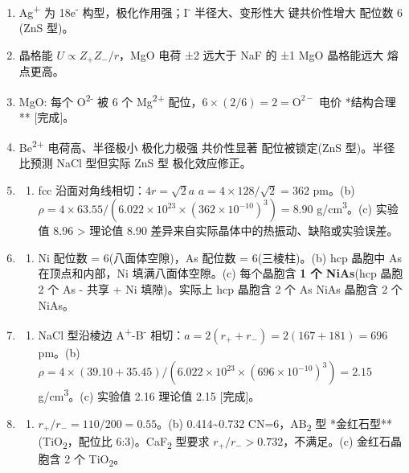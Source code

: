 \begin{enumerate}
\item
  Ag\textsuperscript{+} 为 18e\textsuperscript{-} 构型，极化作用强；I\textsuperscript{-} 半径大、变形性大 \箭 键共价性增大 \箭 配位数 6 (ZnS 型)。
\item
  晶格能 \(U \propto Z_+Z_-/r\)，MgO 电荷 ±2 远大于 NaF 的 ±1 \箭 MgO 晶格能远大 \箭 熔点更高。
\item
  MgO: 每个 O\textsuperscript{2-} 被 6 个 Mg\textsuperscript{2+} 配位，\(6\times(2/6) = 2 = \mathrm{O^{2-}}\) 电价 \箭 **结构合理** {[}完成{]}。
\item
  Be\textsuperscript{2+} 电荷高、半径极小 \箭 极化力极强 \箭 共价性显著  配位被锁定(ZnS 型)。半径比预测 NaCl 型但实际 ZnS 型 \箭 极化效应修正。
\item
  \begin{enumerate}
  \def\labelenumii{(\alph{enumii})}
  \tightlist
  \item
    fcc 沿面对角线相切：\(4r = \sqrt{2}a\) \箭 \(a = 4\times128/\sqrt{2} = 362\) pm。(b) \(\rho = 4\times63.55/(6.022\times10^{23}\times(362\times10^{-10})^3) = 8.90\) g/cm\textsuperscript{3}。(c) 实验值 8.96 \textgreater{} 理论值 8.90 \箭 差异来自实际晶体中的热振动、缺陷或实验误差。
  \end{enumerate}
\item
  \begin{enumerate}
  \def\labelenumii{(\alph{enumii})}
  \tightlist
  \item
    Ni 配位数 = 6(八面体空隙)，As 配位数 = 6(三棱柱)。(b) hcp 晶胞中 As 在顶点和内部，Ni 填满八面体空隙。(c) 每个晶胞含 \textbf{1 个 NiAs}(hcp 晶胞 2 个 As - 共享 + Ni 填隙)。实际上 hcp 晶胞含 2 个 As \箭 NiAs 晶胞含 2 个 NiAs。
  \end{enumerate}
\item
  \begin{enumerate}
  \def\labelenumii{(\alph{enumii})}
  \tightlist
  \item
    NaCl 型沿棱边 A\textsuperscript{+}-B\textsuperscript{-} 相切：\(a = 2(r_+ + r_-) = 2(167+181) = 696\) pm。(b) \(\rho = 4\times(39.10+35.45)/(6.022\times10^{23}\times(696\times10^{-10})^3) = 2.15\) g/cm\textsuperscript{3}。(c) 实验值 2.16  理论值 2.15 {[}完成{]}。
  \end{enumerate}
\item
  \begin{enumerate}
  \def\labelenumii{(\alph{enumii})}
  \tightlist
  \item
    \(r_+/r_- = 110/200 = 0.55\)。(b) 0.414\textasciitilde0.732 \箭 CN=6，AB\textsubscript{2} 型 \箭 **金红石型**(TiO\textsubscript{2}，配位比 6:3)。CaF\textsubscript{2} 型要求 \(r_+/r_->0.732\)，不满足。(c) 金红石晶胞含 2 个 TiO\textsubscript{2}。

\end{enumerate}
\end{enumerate}
